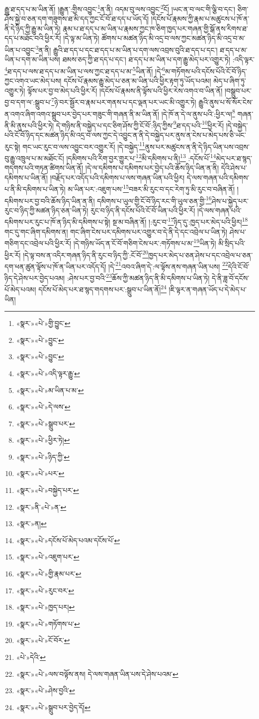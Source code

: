 རྒྱུ་ཐ་དད་པ་མ་ཡིན་ནོ། །རྒྱུན་:གྱིས་འབྱུང་\footnote{«སྣར་»«པེ་»གྱི་བྱུང་}ན་ནི། འདམ་བུ་ལས་འབྱུང་\footnote{«སྣར་»«པེ་»བྱུང་}ངོ། །ཡང་ན་བ་ལང་གི་ལྕི་བ་དང་། ཅིག་ཤོས་སྐྱེ་བ་ཅན་དག་གཟུགས་ཐ་མི་དད་ཀྱང་ངོ་བོ་ཐ་དད་པ་ཡོད་དོ། །དངོས་པོ་རྣམས་ཀྱི་རྣམ་པ་མཚུངས་པ་ཁོ་ན་ནི་དེ་ཉིད་ཀྱི་རྒྱུ་མ་ཡིན་ཏེ། རྣམ་པ་ཐ་དད་པ་མ་ཡིན་པ་རྣམས་ཀྱང་ཁ་ཅིག་ཁྱད་པར་གཞན་གྱི་སྒོ་ནས་རིགས་ཐ་དད་པ་མཐོང་བའི་ཕྱིར་རོ། །དེ་ལྟ་མ་ཡིན་ཏེ། ཚོགས་པ་མཚན་ཉིད་མི་འདྲ་བ་ལས་ཀྱང་མཚན་ཉིད་མི་འདྲ་བ་མ་ཡིན་པ་འབྱུང་\footnote{«སྣར་»«པེ་»བྱུང་}ན་ནི། རྒྱུའི་ཐ་དད་པ་དང་ཐ་དད་པ་མ་ཡིན་པ་དག་ལས་འབྲས་བུའི་ཐ་དད་པ་དང་། ཐ་དད་པ་མ་ཡིན་པ་དག་མ་ཡིན་པས། ཐམས་ཅད་ཀྱི་ཐ་དད་པ་དང་། ཐ་དད་པ་མ་ཡིན་པ་དག་རྒྱུ་མེད་པར་འགྱུར་ཏེ། :འདི་ལྟར་\footnote{«སྣར་»«པེ་»འདི་ལྟར་རྒྱུ་}ཐ་དད་པ་ལས་ཐ་དད་པ་མ་ཡིན་པ་ལས་ཀྱང་ཐ་དད་པ་མ་\footnote{«སྣར་»«པེ་»མ་ཡིན་པ་མ་}ཡིན་ནོ། །དེ་\footnote{«སྣར་»«པེ་»དེ་ལས་}མ་གཏོགས་པའི་དངོས་པོའི་ངོ་བོ་ཉིད་ཀྱང་འགའ་ཡང་མེད་པས། དངོས་པོ་རྣམས་རྒྱུ་མེད་པ་ཅན་མ་ཡིན་པའི་ཕྱིར་རྟག་ཏུ་ཡོད་པའམ། མེད་པ་ཞིག་ཏུ་འགྱུར་ཏེ། ལྟོས་པར་བྱ་བ་མེད་པའི་ཕྱིར་རོ། །དངོས་པོ་རྣམས་ནི་ལྟོས་པའི་ཕྱིར་རེས་འགའ་བ་ཡིན་ནོ། །བསྒྲུབ་པར་བྱ་བ་དག་ལ་:སྒྲུབ་པ་\footnote{«སྣར་»«པེ་»སྒྲུབ་པར་}ཉེ་བར་སྦྱོར་བ་རྣམ་པར་གནས་པ་དང་ལྡན་པར་ཡང་མི་འགྱུར་ཏེ། རྒྱུའི་ནུས་པ་སོ་སོར་ངེས་ན་འགའ་ཞིག་འགའ་སྒྲུབ་པར་བྱེད་པར་གཟུང་གི་གཞན་ནི་མ་ཡིན་ནོ། །དེ་ཁོ་ན་དེ་ལ་ནུས་པའི་:ཕྱིར་ལ།\footnote{«སྣར་»«པེ་»ཕྱིར་ཏེ།} གཞན་ནི་མི་ནུས་པའི་ཕྱིར་ཏེ། དེ་གཉིས་ནི་བསྐྱེད་པ་དང་ཅིག་ཤོས་ཀྱི་ངོ་བོ་:ཉིད་ཀྱིས་\footnote{«སྣར་»«པེ་»ཉིད་ཀྱི་}ཐ་དད་པའི་\footnote{«སྣར་»«པེ་»པར་}ཕྱིར་རོ། །དེ་བསྐྱེད་པའི་ངོ་བོ་ཉིད་དང་མཚན་ཉིད་མི་འདྲ་བ་ལས་ཀྱང་དེ་འབྱུང་ན་ནི་དེ་བསྐྱེད་པར་ནུས་ན་ངེས་པ་མེད་པས་ཅི་ཡང་རུང་སྟེ། གང་ཡང་རུང་བ་ལས་འབྱུང་བར་འགྱུར་རོ། །དེ་བསྐྱེད་\footnote{«སྣར་»«པེ་»བསྐྱེད་པར་}ནུས་པར་མཚུངས་ན་ནི་དེ་ཉིད་ཡིན་པས་འབྲས་བུ་རྒྱུ་འཁྲུལ་པ་མ་མཐོང་ངོ། །དམིགས་པའི་རིག་བྱར་གྱུར་པ་\footnote{«སྣར་»ནི་«པེ་»ན་}མི་དམིགས་པ་ནི།\footnote{«སྣར་»ན།} :དངོས་པོ་\footnote{«སྣར་»«པེ་»དངོས་པོ་མེད་པའམ་དངོས་པོ་}མེད་པར་ཐ་སྙད་གདགས་པའི་གཏན་ཚིགས་ཡིན་ནོ། །དེ་ལ་དམིགས་པ་དམིགས་པར་བྱེད་པའི་ཆོས་ཉིད་ཡིན་ན་ནི། དེའི་ཤེས་པ་དམིགས་པ་ཡིན་ནོ། །བརྗོད་པར་འདོད་པའི་དམིགས་པ་ལས་གཞན་ཡིན་པའི་ཕྱིར། དེ་ལས་གཞན་པའི་དམིགས་པ་ནི་མི་དམིགས་པ་ཡིན་ཏེ། མ་ཡིན་པར་:འཇུག་པས་\footnote{«སྣར་»«པེ་»འཇུག་པར་}བཟར་མི་རུང་བ་དང་རེག་ཏུ་མི་རུང་བ་བཞིན་ནོ། །དམིགས་པར་བྱ་བའི་ཆོས་ཉིད་ཡིན་ན་ནི། དམིགས་པ་ཡུལ་གྱི་ངོ་བོ་ཉིད་རང་གི་ཡུལ་ཅན་གྱི་\footnote{«སྣར་»«པེ་»གྱི་རྣམ་པར་}ཤེས་པ་སྐྱེད་པར་རུང་བ་ཉིད་ཀྱི་མཚན་ཉིད་ཅན་ཡིན་ཏེ། རུང་བ་ཉིད་ནི་དངོས་པོའི་ངོ་བོ་ཡིན་པའི་ཕྱིར་རོ། །དེ་ལས་གཞན་པའི་དམིགས་པར་རུང་པ་ཁོ་ན་ཉིད་མི་དམིགས་པ་སྟེ། སྔ་མ་བཞིན་ནོ། །:རུང་བ་\footnote{«སྣར་»«པེ་»རུང་བར་}ཉིད་དུ་:ཁྱད་པར་མེད་པའི་ཕྱིར།\footnote{«སྣར་»«པེ་»ཁྱད་པར།} གང་དུ་གང་ཞིག་དམིགས་ན། གང་ཞིག་ངེས་པར་དམིགས་པར་འགྱུར་བ་དེ་ནི་དེ་དང་འབྲེལ་པ་ཡིན་ཏེ། ཤེས་པ་གཅིག་དང་འབྲེལ་པའི་ཕྱིར་རོ། །དེ་གཉིས་ཡོད་ན་ངོ་བོ་གཅིག་ངེས་པར་:གཏོགས་པ་མ་\footnote{«སྣར་»«པེ་»གཏོགས་པ་}ཡིན་ཏེ། མི་སྲིད་པའི་ཕྱིར་རོ། །དེ་ལྟ་བས་ན་འདིར་གཞན་ཉིད་ནི་རུང་བ་ཉིད་ཀྱི་:ངོ་བོ་\footnote{«སྣར་»«པེ་»ངོ་བོར་}ཁྱད་པར་མེད་པ་ཅན་ཤེས་པ་དང་འབྲེལ་པ་ཅན་དག་ཕན་ཚུན་ལྟོས་པ་ཁོ་ན་ཡིན་པར་འདོད་དོ། །དེ་\footnote{«པེ་»དེའི་}འབའ་ཞིག་དེ་:ལ་ལྟོས་ནས་གཞན་ཡིན་པས། \footnote{«སྣར་»«པེ་»ལས་བལྟོས་ནས། དེ་ལས་གཞན་ཡིན་པས་དེ་ཤེས་པའམ་}དེའི་ངོ་བོ་ཉིད་དེ་ཤེས་པར་བྱེད་པའམ། :ཤེས་པར་བྱ་བའི་\footnote{«སྣར་»«པེ་»ཤེས་བྱའི་}ཆོས་ཀྱི་མཚན་ཉིད་ནི་མི་དམིགས་པ་ཡིན་ཏེ། དེ་ནི་ཟླ་བོ་དངོས་པོ་མེད་པའམ། དངོས་པོ་མེད་པར་ཐ་སྙད་གདགས་པར་:སྒྲུབ་པ་ཡིན་ནོ།\footnote{«སྣར་»«པེ་»སྒྲུབ་པར་བྱེད་དོ།} །ཇི་ལྟར་ན་གཞན་ཡོད་པ་དེ་མེད་པ་ཡིན། 